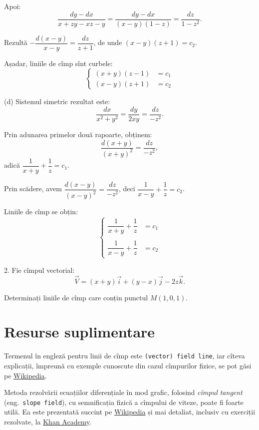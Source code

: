 Apoi:
\[
  \frac{dy - dx}{x + zy - xz - y} = \frac{dy - dx}{(x - y)(1 - z)} = \frac{dz}{1 - z^2}.
\]

Rezultă $-\dfrac{d(x - y)}{x - y} = \dfrac{dz}{z + 1}$, de unde $(x - y)(z + 1) = c_2$.

Așadar, liniile de cîmp sînt curbele:
\[
  \begin{cases}
    (x + y)(z - 1) &= c_1 \\
    (x - y)(z + 1) &= c_2
  \end{cases}
\]

\vspace{1cm}

(d) Sistemul simetric rezultat este:
\[
  \frac{dx}{x^2 + y^2} = \frac{dy}{2xy} = \frac{dz}{-z^2}.
\]

Prin adunarea primelor două rapoarte, obținem:
\[
  \frac{d(x + y)}{(x + y)^2} = \frac{dz}{-z^2},
\]
adică $\dfrac{1}{x + y} + \dfrac{1}{z} = c_1$.

Prin scădere, avem $\dfrac{d(x - y)}{(x - y)^2} = \dfrac{dz}{-z^2}$, deci
$\dfrac{1}{x - y} + \dfrac{1}{z} = c_2$.

Liniile de cîmp se obțin:
\[
  \begin{cases}
    \dfrac{1}{x + y} + \dfrac{1}{z} &= c_1 \\
    & \\
    \dfrac{1}{x - y} + \dfrac{1}{z} &= c_2
  \end{cases}
\]

\vspace{0.3cm}

2. Fie cîmpul vectorial:
\[
  \vec{V} = (x + y)\vec{i} + (y - x)\vec{j} - 2z\vec{k}.
\]

Determinați liniile de cîmp care conțin punctul $ M(1, 0, 1) $.


\section{Resurse suplimentare}

\indent\indent Termenul în engleză pentru linii de cîmp este \texttt{(vector) field line}, iar cîteva
explicații, împreună cu exemple cunoscute din cazul cîmpurilor fizice, se pot
găsi pe \href{https://en.wikipedia.org/wiki/Field\_line}{Wikipedia}.

Metoda rezolvării ecuațiilor diferențiale în mod grafic, folosind \emph{cîmpul %
  tangent} (eng.\ \texttt{slope field}), cu semnificația fizică a cîmpului de
viteze, poate fi foarte utilă. Ea este prezentată succint pe
\href{https://en.wikipedia.org/wiki/Slope\_field}{Wikipedia} și mai detaliat,
inclusiv cu exerciții rezolvate, la \href{https://www.khanacademy.org/math/ap-calculus-ab/ab-differential-equations-new/ab-7-3/v/creating-a-slope-field}{Khan Academy}.

